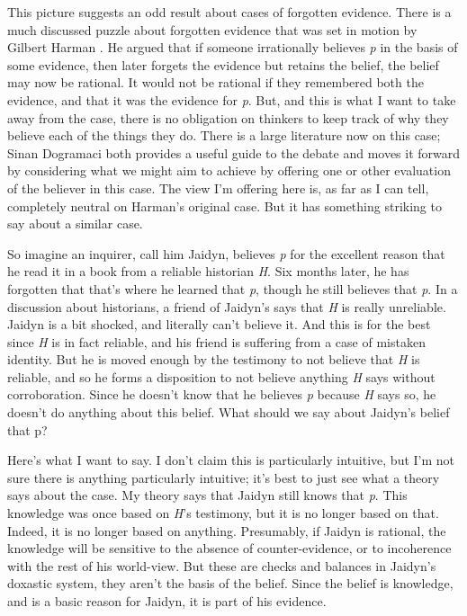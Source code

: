 \documentclass[
  11pt,
]{book}
\begin{document}
This picture suggests an odd result about cases of forgotten evidence. There is a much discussed puzzle about forgotten evidence that was set in motion by Gilbert Harman \citeyearpar{Harman1986}. He argued that if someone irrationally believes \emph{p} in the basis of some evidence, then later forgets the evidence but retains the belief, the belief may now be rational. It would not be rational if they remembered both the evidence, and that it was the evidence for \emph{p}. But, and this is what I want to take away from the case, there is no obligation on thinkers to keep track of why they believe each of the things they do. There is a large literature now on this case; Sinan Dogramaci \citeyearpar{Dogramaci2015} both provides a useful guide to the debate and moves it forward by considering what we might aim to achieve by offering one or other evaluation of the believer in this case. The view I'm offering here is, as far as I can tell, completely neutral on Harman's original case. But it has something striking to say about a similar case.

So imagine an inquirer, call him Jaidyn, believes \emph{p} for the excellent reason that he read it in a book from a reliable historian \emph{H}. Six months later, he has forgotten that that's where he learned that \emph{p}, though he still believes that \emph{p}. In a discussion about historians, a friend of Jaidyn's says that \emph{H} is really unreliable. Jaidyn is a bit shocked, and literally can't believe it. And this is for the best since \emph{H} is in fact reliable, and his friend is suffering from a case of mistaken identity. But he is moved enough by the testimony to not believe that \emph{H} is reliable, and so he forms a disposition to not believe anything \emph{H} says without corroboration. Since he doesn't know that he believes \emph{p} because \emph{H} says so, he doesn't do anything about this belief. What should we say about Jaidyn's belief that p?

Here's what I want to say. I don't claim this is particularly intuitive, but I'm not sure there is anything particularly intuitive; it's best to just see what a theory says about the case. My theory says that Jaidyn still knows that \emph{p}. This knowledge was once based on \emph{H}'s testimony, but it is no longer based on that. Indeed, it is no longer based on anything. Presumably, if Jaidyn is rational, the knowledge will be sensitive to the absence of counter-evidence, or to incoherence with the rest of his world-view. But these are checks and balances in Jaidyn's doxastic system, they aren't the basis of the belief. Since the belief is knowledge, and is a basic reason for Jaidyn, it is part of his evidence.
\end{document}
